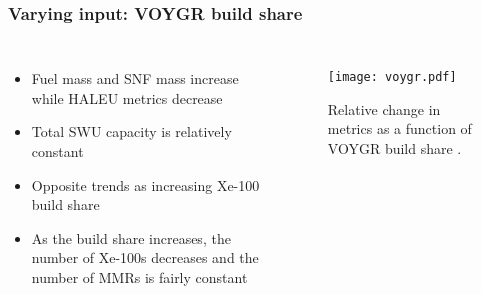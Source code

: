 \begin{frame}
    \frametitle{Varying input: VOYGR build share}
    \begin{columns}
        \column{4.5cm}
            \begin{itemize}
                \item Fuel mass and SNF mass increase while \gls{HALEU}
                      metrics decrease 
                \item Total SWU capacity is relatively constant
                \item Opposite trends as increasing Xe-100 build share
                \item As the build share increases, the number of Xe-100s
                      decreases and the number of MMRs is fairly constant
                
            \end{itemize}
        \column{5.5cm}
        \begin{figure}
            \centering 
            \texttt{[image: voygr.pdf]}
            \caption{Relative change in metrics as a function 
            of VOYGR build share \protect\cite{bachmann_sensitivity_2022}.}
            \label{fig:voygr}
        \end{figure}
    \end{columns}
\end{frame}
